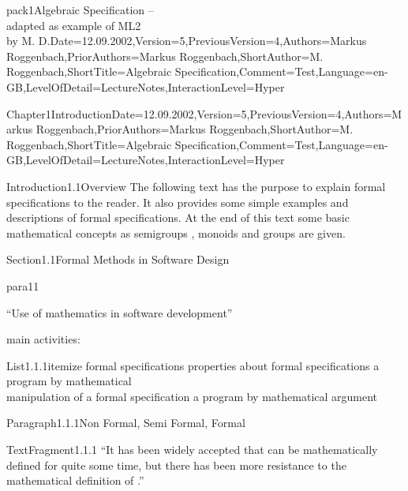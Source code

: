 \documentclass[landscape, slides, light]{mmiss2}
\begin{document}
\begin{Package}{pack1}{Algebraic
Specification -- \\ adapted as example of ML2\\ by M. D.}{Date=12.09.2002,Version=5,PreviousVersion=4,Authors={Markus
Roggenbach},PriorAuthors={Markus
Roggenbach},ShortAuthor={M. Roggenbach},ShortTitle={Algebraic Specification},Comment=Test,Language=en-GB,LevelOfDetail=LectureNotes,InteractionLevel=Hyper}

\begin{Section}{Chapter1}{Introduction}{Date=12.09.2002,Version=5,PreviousVersion=4,Authors={Markus
Roggenbach},PriorAuthors={Markus
Roggenbach},ShortAuthor={M. Roggenbach},ShortTitle={Algebraic Specification},Comment=Test,Language=en-GB,LevelOfDetail=LectureNotes,InteractionLevel=Hyper}
\begin{Introduction}{Introduction1.1}{Overview}{}
The following text has the purpose to explain formal
specifications to the reader. It also provides some simple examples
and descriptions of formal specifications. At the end of this text some
basic mathematical concepts as semigroups
, monoids
 and groups
 are given.
\end{Introduction}
\begin{Section}{Section1.1}{Formal Methods in Software Design}{}
\begin{Paragraph}{para11}{}{}
\begin{center}
``Use of mathematics in software development''\\
\end{center}
main activities:
\begin{List}{List1.1.1}{itemize}{}
\ListItem{}
{ formal specifications  \pause}
\ListItem{}
{ properties about formal specifications \pause}
\ListItem{}
{ a program by mathematical \\
            manipulation of a formal specification \pause}
\ListItem{}
{ a program by mathematical argument}
\end{List}
\end{Paragraph}

\begin{Paragraph}{Paragraph1.1.1}{Non Formal, Semi Formal, Formal}{}

\begin{TextFragment}{TextFragment1.1.1}{}
``It has been widely accepted that  can be mathematically
defined for quite some time, but there has been more resistance to the
mathematical definition of .''
\end{TextFragment}


\end{Paragraph}
\end{Section}
\end{Section}
\end{Package}
\end{document}
